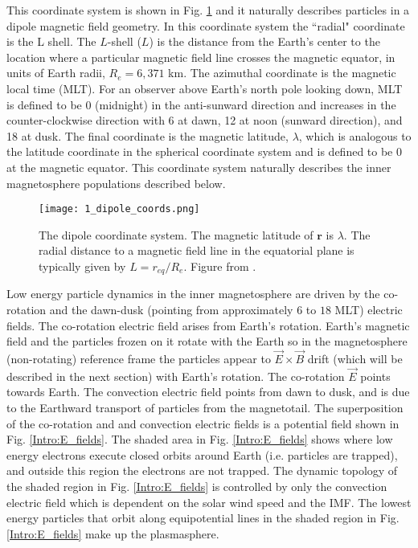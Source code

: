 This coordinate system is shown in Fig. \ref{Intro:dipole_coords} and it naturally describes particles in a dipole magnetic field geometry. In this coordinate system the ``radial" coordinate is the L shell. The $L$-shell ($L$) is the distance from the Earth's center to the location where a particular magnetic field line crosses the magnetic equator, in units of Earth radii, $R_e = 6,371$ km. The azimuthal coordinate is the magnetic local time (MLT). For an observer above Earth's north pole looking down, MLT is defined to be 0 (midnight) in the anti-sunward direction and increases in the counter-clockwise direction with 6 at dawn, 12 at noon (sunward direction), and 18 at dusk. The final coordinate is the magnetic latitude, $\lambda$, which is analogous to the latitude coordinate in the spherical coordinate system and is defined to be 0 at the magnetic equator. This coordinate system naturally describes the inner magnetosphere populations described below.

\begin{figure}
\texttt{[image: 1\_dipole\_coords.png]}
\caption{The dipole coordinate system. The magnetic latitude of $\mathbf{r}$ is $\lambda$. The radial distance to a magnetic field line in the equatorial plane is typically given by $L = r_{eq}/R_e$. Figure from \citet{Baumjohann1997}.}
\label{Intro:dipole_coords}
\end{figure}

Low energy particle dynamics in the inner magnetosphere are driven by the co-rotation and the dawn-dusk (pointing from approximately $6$ to $18$ MLT) electric fields. The co-rotation electric field arises from Earth's rotation. Earth's magnetic field and the particles frozen on it rotate with the Earth so in the magnetosphere (non-rotating) reference frame the particles appear to $\vec{E} \times \vec{B}$ drift (which will be described in the next section) with Earth's rotation. The co-rotation $\vec{E}$ points towards Earth. The convection electric field points from dawn to dusk, and is due to the Earthward transport of particles from the magnetotail. The superposition of the co-rotation and and convection electric fields is a potential field shown in Fig. \ref{Intro:E_fields}. The shaded area in Fig. \ref{Intro:E_fields} shows where low energy electrons execute closed orbits around Earth (i.e. particles are trapped), and outside this region the electrons are not trapped. The dynamic topology of the shaded region in Fig. \ref{Intro:E_fields} is controlled by only the convection electric field which is dependent on the solar wind speed and the IMF. The lowest energy particles that orbit along equipotential lines in the shaded region in Fig. \ref{Intro:E_fields} make up the plasmasphere.

